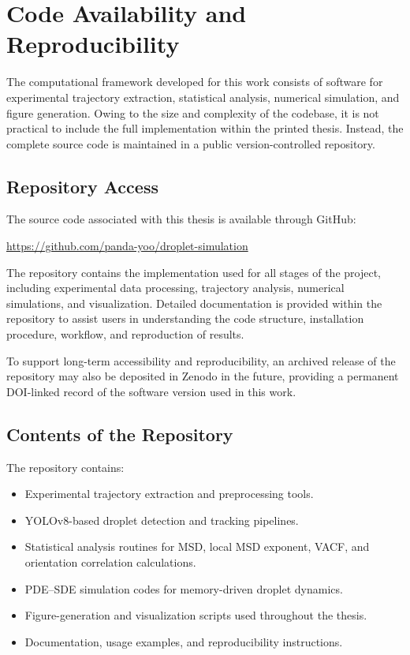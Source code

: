 \chapter{Code Availability and Reproducibility}
\label{app:code}

The computational framework developed for this work consists of software for experimental trajectory extraction, statistical analysis, numerical simulation, and figure generation. Owing to the size and complexity of the codebase, it is not practical to include the full implementation within the printed thesis. Instead, the complete source code is maintained in a public version-controlled repository.

\section{Repository Access}

The source code associated with this thesis is available through GitHub:

\begin{center}
\url{https://github.com/panda-yoo/droplet-simulation}
\end{center}

The repository contains the implementation used for all stages of the project, including experimental data processing, trajectory analysis, numerical simulations, and visualization. Detailed documentation is provided within the repository to assist users in understanding the code structure, installation procedure, workflow, and reproduction of results.

To support long-term accessibility and reproducibility, an archived release of the repository may also be deposited in Zenodo in the future, providing a permanent DOI-linked record of the software version used in this work.

\section{Contents of the Repository}

The repository contains:

\begin{itemize}
\item Experimental trajectory extraction and preprocessing tools.
\item YOLOv8-based droplet detection and tracking pipelines.
\item Statistical analysis routines for MSD, local MSD exponent, VACF, and orientation correlation calculations.
\item PDE--SDE simulation codes for memory-driven droplet dynamics.
\item Figure-generation and visualization scripts used throughout the thesis.
\item Documentation, usage examples, and reproducibility instructions.
\end{itemize}

